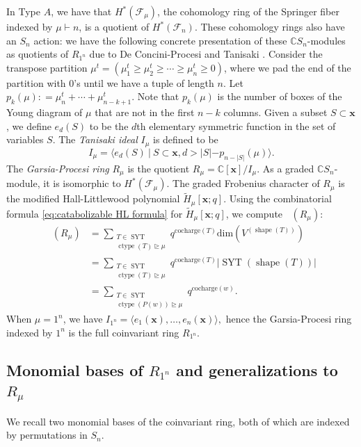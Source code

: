 \documentclass[ALCO, Unicode]{cedram}
\DeclareMathOperator{\syt}{SYT}
\DeclareMathOperator{\ctype}{ctype}
\DeclareMathOperator{\Hilb}{Hilb}
\DeclareMathOperator{\shape}{shape}
\DeclareMathOperator{\Hilbq}{\Hilb_q}
\newcommand{\mHL}{\tilde{H}}
\begin{document}
In Type $A$, we have that $H^{\ast}(\mathcal{F}_\mu)$,  the cohomology ring of the Springer fiber indexed by $\mu\vdash n$, is a quotient of $H^{\ast}(\mathcal{F}_n)$. These cohomology rings also have an $S_n$ action: we have the following concrete presentation of these $\mathbb{C}S_n$-modules as quotients of $R_{1^n}$ due to De Concini-Procesi \cite{deCon-Proc} and Tanisaki \cite{Tanisaki}. 
 Consider the transpose partition $\mu^{t} = (\mu^t_1 \geq \mu^t_2 \geq \cdots \geq  \mu^t_n \geq  0)$, where we pad the end of the partition with $0$'s until we have a tuple of length $n$. Let $p_k (\mu) : =\mu^t_n + \cdots + \mu^t_{n-k+1}$. Note that $p_k(\mu)$ is the number of boxes of the Young diagram of $\mu$ that are not in the first $n-k$ columns.  Given a subset $S\subset \mathbf{x}$, we define $e_d(S)$ to be the $d$th elementary symmetric function in the set of variables  $S$. 
The \textit{Tanisaki ideal} $I_\mu$ is defined to be
\[I_\mu = \langle e_d(S) \ | \ S\subset \mathbf{x}, d> |S| -p_{n-|S|}(\mu) \rangle .\]
The \textit{Garsia-Procesi ring} $R_\mu$ is the quotient  $R_\mu = \mathbb{C}[\mathbf{x}]/I_\mu$.
As a graded $\mathbb{C}S_n$-module, it is isomorphic to $H^{\ast}(\mathcal{F}_\mu)$.
The graded Frobenius character of $R_\mu$ is the modified Hall-Littlewood polynomial $\mHL_{\mu}[\mathbf{x};q]$.
Using the combinatorial formula \eqref{eq:catabolizable HL formula} for $\mHL_{\mu}[\mathbf{x};q]$, we compute $\Hilbq(R_\mu)$:
\begin{align}
     \Hilbq(R_{\mu}) &= \sum\limits_{\substack{T\in \syt\\  \ctype(T)\unrhd\mu}} q^{\text{cocharge}(T)} \text{dim} (V^{(\shape(T))}) \nonumber\\&=  \sum\limits_{\substack{T\in \syt\\  \ctype(T)\unrhd\mu}}  q^{\text{cocharge}(T)} |\syt(\shape(T))| \nonumber \\&=  \sum\limits_{\substack{T\in \syt\\  \ctype(P(w))\unrhd\mu}}  q^{\text{cocharge}(w)}\label{eq:Hilb of R_mu}.
\end{align}
When $\mu = 1^n$, we have $I_{1^n} = \langle e_1(\mathbf{x}),\dots, e_n(\mathbf{x})\rangle,$ hence the Garsia-Procesi ring indexed by $1^n$ is the full coinvariant ring $R_{1^n}$.

\subsection{Monomial bases of \texorpdfstring{$R_{1^n}$}{R\_\{1\^n\}} and generalizations to \texorpdfstring{$R_{\mu}$}{R\_mu}}
We recall two monomial bases of the coinvariant ring, both of which are indexed by permutations in $S_n$.
\end{document}
